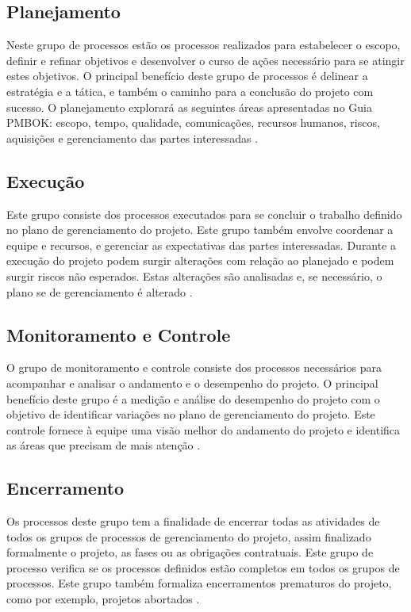 \documentclass[
    12pt,               %
    openright,          %
    twoside,            %
    a4paper,            %
    chapter=TITLE,     %
    english,            %
    spanish,            %
    portuguese              %
    ]{abntex2}
\begin{document}
\subsection{Planejamento}
Neste grupo de processos estão os processos realizados para estabelecer o escopo, definir e refinar objetivos e desenvolver o curso de ações necessário para se atingir estes objetivos. O principal benefício deste grupo de processos é delinear a estratégia e a tática, e também o caminho para a conclusão do projeto com sucesso. O planejamento explorará as seguintes áreas apresentadas no Guia PMBOK: escopo, tempo, qualidade, comunicações, recursos humanos, riscos, aquisições e gerenciamento das partes interessadas \cite[p.~55]{pmi2013}.

\subsection{Execução}
Este grupo consiste dos processos executados para se concluir o trabalho definido no plano de gerenciamento do projeto. Este grupo também envolve coordenar a equipe e recursos, e gerenciar as expectativas das partes interessadas. Durante a execução do projeto podem surgir alterações com relação ao planejado e podem surgir riscos não esperados. Estas alterações são analisadas e, se necessário, o plano se de gerenciamento é alterado \cite[p.~55]{pmi2013}.

\subsection{Monitoramento e Controle}
O grupo de monitoramento e controle consiste dos processos necessários para acompanhar e analisar o andamento e o desempenho do projeto. O principal benefício deste grupo é a medição e análise do desempenho do projeto com o objetivo de identificar variações no plano de gerenciamento do projeto. Este controle fornece à equipe uma visão melhor do andamento do projeto e identifica as áreas que precisam de mais atenção \cite[p.~55]{pmi2013}.

\subsection{Encerramento}
Os processos deste grupo tem a finalidade de encerrar todas as atividades de todos os grupos de processos de gerenciamento do projeto, assim finalizado formalmente o projeto, as fases ou as obrigações contratuais. Este grupo de processo verifica se os processos definidos estão completos em todos os grupos de processos. Este grupo também formaliza encerramentos prematuros do projeto, como por exemplo, projetos abortados \cite[p.~55]{pmi2013}.
\end{document}
